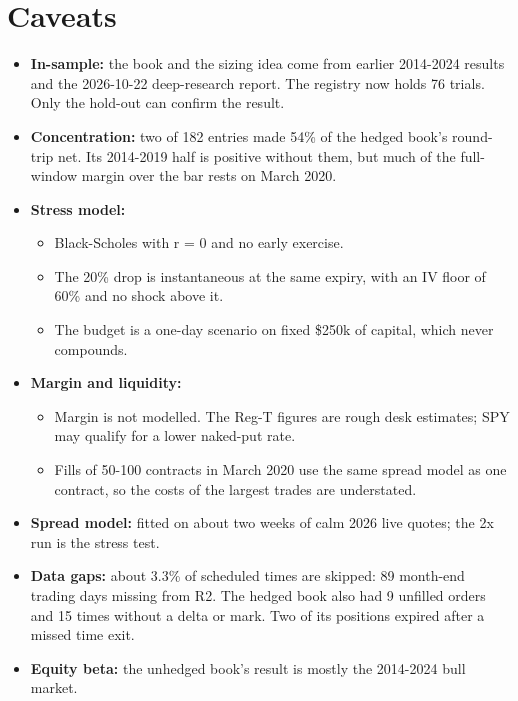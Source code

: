 \documentclass{article}
\begin{document}
\section{Caveats}

\begin{itemize}

\item \textbf{In-sample:} the book and the sizing idea come from earlier 2014-2024 results and the 2026-10-22 deep-research report. The registry now holds 76 trials. Only the hold-out can confirm the result.

\item \textbf{Concentration:} two of 182 entries made 54\% of the hedged book's round-trip net. Its 2014-2019 half is positive without them, but much of the full-window margin over the bar rests on March 2020.

\item \textbf{Stress model:}

\begin{itemize}

\item Black-Scholes with r = 0 and no early exercise.

\item The 20\% drop is instantaneous at the same expiry, with an IV floor of 60\% and no shock above it.

\item The budget is a one-day scenario on fixed \$250k of capital, which never compounds.

\end{itemize}

\item \textbf{Margin and liquidity:}

\begin{itemize}

\item Margin is not modelled. The Reg-T figures are rough desk estimates; SPY may qualify for a lower naked-put rate.

\item Fills of 50-100 contracts in March 2020 use the same spread model as one contract, so the costs of the largest trades are understated.

\end{itemize}

\item \textbf{Spread model:} fitted on about two weeks of calm 2026 live quotes; the 2x run is the stress test.

\item \textbf{Data gaps:} about 3.3\% of scheduled times are skipped: 89 month-end trading days missing from R2. The hedged book also had 9 unfilled orders and 15 times without a delta or mark. Two of its positions expired after a missed time exit.

\item \textbf{Equity beta:} the unhedged book's result is mostly the 2014-2024 bull market.

\end{itemize}
\end{document}
